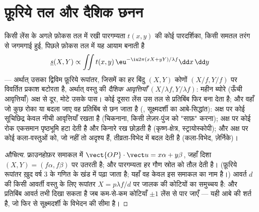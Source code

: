 \section{फ़ूरिये तल और दैशिक छनन}

\begin{proposition}[लेंस कोई फ़ूरिये विश्लेषक]\label{prop:b2:diffraction:fourier}
किसी लेंस के अगले फ़ोकस तल में रखी पारगम्यता $t(x, y)$ की कोई पारदर्शिका,
किसी समतल तरंग से जगमगाई हुई, पिछले फ़ोकस तल में यह
आयाम बनाती है
\[
\underline s(X, Y) \propto \iint t(x, y)\,\eu^{-\iu2\pi(xX + yY)/\lambda f}\dd x\,\dd y
\]
--- अर्थात् उसका द्विविम फ़ूरिये रूपांतर, जिसमें \emph{} का हर बिंदु
$(X, Y)$ कोणों $(X/f, Y/f)$ पर विवर्तित प्रकाश बटोरता है, अर्थात् वस्तु की
\emph{दैशिक आवृत्तियाँ} $(X/\lambda f, Y/\lambda f)$: महीन ब्योरे (ऊँची
आवृत्तियाँ) अक्ष से दूर, मोटे उसके पास। कोई दूसरा लेंस उस तल से प्रतिबिंब
फिर बना देता है; और वहाँ जो कुछ रोका या बदला जाए वह प्रतिबिंब से छन जाता है
(\emph{}, सूक्ष्मदर्शी का आबे-सिद्धांत): अक्ष पर कोई सूचिछिद्र
केवल नीची आवृत्तियाँ रखता है (चिकनाना, किसी लेज़र-पुंज को "साफ़" करना);
अक्ष पर कोई रोक एकसमान पृष्ठभूमि हटा देती है और
किनारे रख छोड़ती है (कृष्ण-क्षेत्र, स्ट्रायोस्कोपी); और अक्ष पर कोई 
कला-वस्तुओं को, जो नहीं तो अदृश्य हैं, तीव्रता-विभेद में बदल देती है
(कला-विभेद, ज़ेर्निके)।
\end{proposition}

\begin{proof}[औचित्य]
फ्राउनहोफ़र समाकल में $\vect{OP}\cdot\vect u = x\alpha + y\beta$, जहाँ
दिशा $(X, Y) = (f\alpha, f\beta)$ पर उतरती है; और पारगम्यता
हर गौण स्रोत को तौल देती है। (फ़ूरिये रूपांतर ख़ुद वर्ष 3 के गणित के खंड में
पढ़ा जाता है; यहाँ वह केवल इस समाकल का नाम है।)
आवर्त $d$ की किसी आवर्ती वस्तु के लिए रूपांतर $X = p\lambda f/d$ पर जालक की
कोटियों का समुच्चय है: और प्रतिबिंब आवर्त तभी दिखा सकता है जब
कम-से-कम कोटियाँ $\pm1$ लेंस से पार जाएँ --- यही आबे की शर्त है, जो
फिर से सूक्ष्मदर्शी के विभेदन की सीमा है।
\end{proof}

